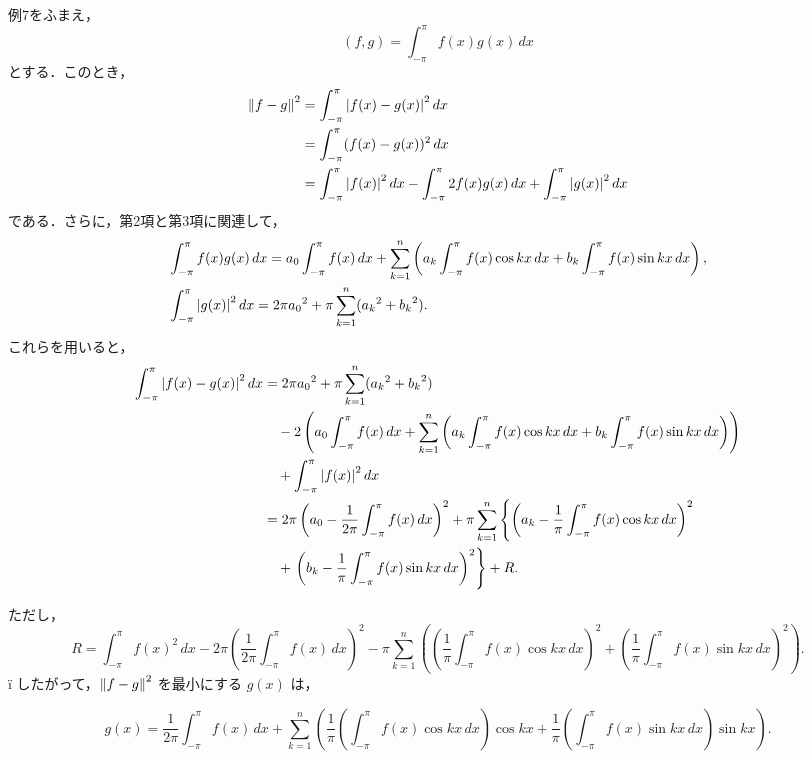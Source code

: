 \documentclass[a4paper,10pt,fleqn]{ltjsarticle}
\begin{document}
\begin{tleftbar}
    例7をふまえ，
    \[
        (f, g) = \int_{-\pi}^{\pi} f(x) g(x) \, dx
    \]
    とする．このとき，
    \begin{align*}
        \norm{f-g}^2 & = \int_{-\pi}^{\pi} \abs{f(x) - g(x)}^2 \, dx                                                                       \\
                     & = \int_{-\pi}^{\pi} (f(x)-g(x))^2 \, dx                                                                             \\
                     & = \int_{-\pi}^{\pi} \abs{f(x)}^2 \,dx - \int_{-\pi}^{\pi} 2 f(x) g(x) \, dx + \int_{-\pi}^{\pi} \abs{g(x)}^2 \,  dx
    \end{align*}
    である．さらに，第2項と第3項に関連して，
    \begin{align*}
         & \int_{-\pi}^{\pi} f(x) g(x)  \, dx = a_0 \int_{-\pi}^{\pi} f(x) \,  dx + \sum_{k=1}^{n} \left( a_k \int_{-\pi}^{\pi} f(x) \cos kx \, dx + b_k \int_{-\pi}^{\pi} f(x) \sin kx \, dx \right), \\
         & \int_{-\pi}^{\pi} \abs{g(x)}^2 \,dx = 2\pi {a_0}^2 + \pi \sum_{k=1}^{n} ({a_k}^2 + {b_k}^2).
    \end{align*}
    これらを用いると，
    \begin{align*}
        \int_{-\pi}^{\pi} \abs{f(x) - g(x)}^2 \, dx
         & = 2\pi {a_0}^2 + \pi \sum_{k=1}^{n} ({a_k}^2 + {b_k}^2)                                                     \\
         & \quad - 2 \left( a_0 \int_{-\pi}^{\pi} f(x) \, dx
        + \sum_{k=1}^{n} \left( a_k \int_{-\pi}^{\pi} f(x) \cos kx \, dx
        + b_k \int_{-\pi}^{\pi} f(x) \sin kx \, dx \right) \right)                                                     \\
         & \quad + \int_{-\pi}^{\pi} \abs{f(x)}^2 \, dx                                                                \\
         & = 2\pi \left( a_0 - \frac{1}{2\pi} \int_{-\pi}^{\pi} f(x) \, dx \right)^2
        + \pi \sum_{k=1}^{n} \left\{ \left( a_k - \frac{1}{\pi} \int_{-\pi}^{\pi} f(x) \cos kx \, dx \right)^2 \right. \\
         & \quad + \left. \left( b_k - \frac{1}{\pi} \int_{-\pi}^{\pi} f(x) \sin kx \, dx \right)^2 \right\} + R.
    \end{align*}

    ただし，
    \[
        R= \int_{-\pi}^{\pi} f(x)^2 \, dx - 2\pi \left( \frac{1}{2\pi} \int_{-\pi}^{\pi} f(x) \, dx \right)^2 - \pi \sum_{k=1}^{n} \left( \left( \frac{1}{\pi} \int_{-\pi}^{\pi} f(x) \cos kx \, dx \right)^2 + \left( \frac{1}{\pi} \int_{-\pi}^{\pi} f(x) \sin kx \, dx \right)^2 \right).
    \]
    ï
    したがって，$\norm{f - g}^2$ を最小にする $g(x)$ は，

    \[
        g(x) = \frac{1}{2\pi} \int_{-\pi}^{\pi} f(x) \, dx + \sum_{k=1}^{n} \left(\frac{1}{\pi}  \left(\int_{-\pi}^{\pi} f(x) \cos kx \, dx \right) \cos kx + \frac{1}{\pi} \left(\int_{-\pi}^{\pi} f(x) \sin kx\,  dx \right) \sin kx \right).
    \]
\end{tleftbar}
\end{document}
